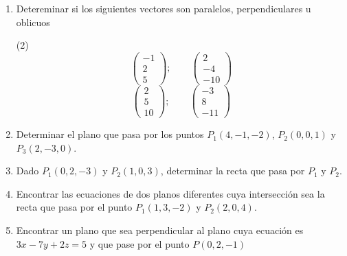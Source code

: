 \documentclass[12pt]{article}
\newenvironment{preguntas}
{\begin{enumerate}\itemsep12pt
	}
	{
	\end{enumerate}
}
\begin{document}
\begin{preguntas}
		$$
	v_1 = \begin{pmatrix}
	2\\
	1\\
	5
\end{pmatrix};\qquad
	v_2 = \begin{pmatrix}
	-1\\
	-3\\
	0
\end{pmatrix}$$
\begin{enumerate}[a)]
\item Buscar un vector $v_3$ que sea perpendicular a $v_1$ y $v_2$ y verificar que efectivamente sea perpendicular a ambos.
\item Buscar un vector paralelo a $(v_2-v_3)$ y verificar que lo sea
\item Encontrar un vector perpendicular a $(v_3 + 3v_1)$
\end{enumerate}
\item Detereminar si los siguientes vectores son paralelos, perpendiculares u oblicuos
\begin{tasks}(2)
\task $$ 
			\begin{pmatrix}
			-1\\
			2\\
			5
		\end{pmatrix};\qquad
			\begin{pmatrix}
			2\\
			-4\\
			-10
		\end{pmatrix}$$
\task  $$ 
			\begin{pmatrix}
			2\\
			5\\
			10
		\end{pmatrix};\qquad
			\begin{pmatrix}
			-3\\
			8\\
			-11
		\end{pmatrix}$$
\end{tasks}
\item Determinar el plano que pasa por los puntos $P_1(4,-1,-2)$, $P_2(0,0,1)$ y $P_3(2,-3,0)$.
\item Dado $P_1(0,2,-3)$ y $P_2(1,0,3)$, determinar la recta que pasa por $P_1$ y $P_2$.
\item Encontrar las ecuaciones de dos planos diferentes cuya intersección sea la recta que pasa por el punto $P_1(1,3,-2)$ y $P_2(2,0,4)$.
\item Encontrar un plano que sea perpendicular al plano cuya ecuación es $3x -7y +2z = 5$ y que pase por el punto $P(0,2,-1)$

\end{preguntas}
\end{document}
